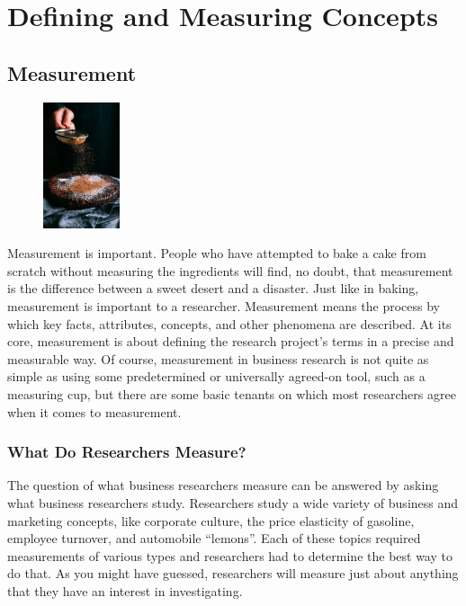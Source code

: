 \chapter{Defining and Measuring Concepts}\label{ch05:measuring}

\section{Measurement}

\begin{figure}
	\label{05:fig01} 
	\centering
	\includegraphics[width=0.2\textwidth]{gfx/05-cake} 
\end{figure}

Measurement is important. People who have attempted to bake a cake from scratch without measuring the ingredients will find, no doubt, that measurement is the difference between a sweet desert and a disaster. Just like in baking, measurement is important to a researcher. Measurement means the process by which key facts, attributes, concepts, and other phenomena are described. At its core, measurement is about defining the research project's terms in a precise and measurable way. Of course, measurement in business research is not quite as simple as using some predetermined or universally agreed-on tool, such as a measuring cup, but there are some basic tenants on which most researchers agree when it comes to measurement.


\subsection{What Do Researchers Measure?}

The question of what business researchers measure can be answered by asking what business researchers study. Researchers study a wide variety of business and marketing concepts, like corporate culture\cite{denison1990corporate}, the price elasticity of gasoline\cite{hughes2006evidence}, employee turnover\cite{hom1995employee}, and automobile ``lemons''\cite{akerlof1978market}. Each of these topics required measurements of various types and researchers had to determine the best way to do that. As you might have guessed, researchers will measure just about anything that they have an interest in investigating. 

